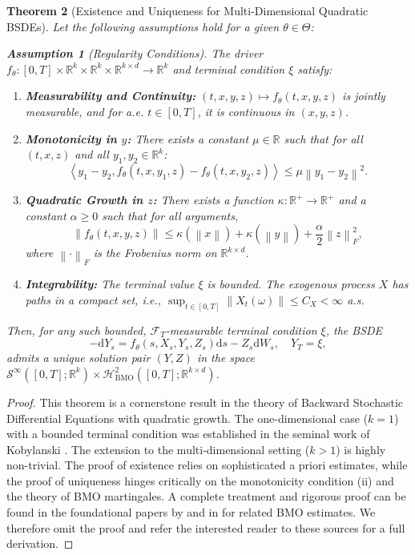 \documentclass[qian]{imsart}
\newcommand{\R}{\mathbb{R}}
\newcommand{\Fcal}{\mathcal{F}}
\newcommand{\dd}{\mathrm{d}}
\newcommand{\norm}[1]{\left\lVert#1\right\rVert}
\newcommand{\scpr}[2]{\left\langle #1, #2 \right\rangle}
\theoremstyle{plain}
\newtheorem{theorem}{Theorem}[section]
\theoremstyle{definition}
\newtheorem{assumption}[theorem]{Assumption}
\begin{document}
\begin{theorem}[Existence and Uniqueness for Multi-Dimensional Quadratic BSDEs]
\label{thm:wellposedness_multidim_recap}
Let the following assumptions hold for a given $\theta \in \Theta$:
\begin{assumption}[Regularity Conditions]
\label{ass:wellposedness_multidim}
The driver $f_\theta: [0,T] \times \R^k \times \R^k \times \R^{k \times d} \to \R^k$ and terminal condition $\xi$ satisfy:
\begin{enumerate}[label=(\roman*)]
    \item \textbf{Measurability and Continuity:} $(t,x,y,z) \mapsto f_\theta(t,x,y,z)$ is jointly measurable, and for a.e. $t \in [0,T]$, it is continuous in $(x,y,z)$.
    \item \textbf{Monotonicity in $y$:} There exists a constant $\mu \in \R$ such that for all $(t,x,z)$ and all $y_1, y_2 \in \R^k$:
    \[ \scpr{y_1 - y_2}{f_\theta(t,x,y_1,z) - f_\theta(t,x,y_2,z)} \le \mu \norm{y_1 - y_2}^2. \]
    \item \textbf{Quadratic Growth in $z$:} There exists a function $\kappa: \R^+ \to \R^+$ and a constant $\alpha \ge 0$ such that for all arguments,
    \[ \norm{f_\theta(t,x,y,z)} \le \kappa(\norm{x}) + \kappa(\norm{y}) + \frac{\alpha}{2}\norm{z}_F^2, \]
    where $\norm{\cdot}_F$ is the Frobenius norm on $\R^{k \times d}$.
    \item \textbf{Integrability:} The terminal value $\xi$ is bounded. The exogenous process $X$ has paths in a compact set, i.e., $\sup_{t \in [0,T]} \norm{X_t(\omega)} \le C_X < \infty$ a.s.
\end{enumerate}
\end{assumption}
Then, for any such bounded, $\Fcal_T$-measurable terminal condition $\xi$, the BSDE
\begin{equation} \label{eq:bsde_def_multidim_revised}
    -\dd Y_s = f_\theta(s, X_s, Y_s, Z_s) \dd s - Z_s \dd W_s, \quad Y_T = \xi,
\end{equation}
admits a unique solution pair $(Y,Z)$ in the space $\mathcal{S}^\infty([0,T];\R^k) \times \mathcal{H}^2_{\mathrm{BMO}}([0,T];\R^{k \times d})$.
\end{theorem}

\begin{proof}
This theorem is a cornerstone result in the theory of Backward Stochastic Differential Equations with quadratic growth. The one-dimensional case ($k=1$) with a bounded terminal condition was established in the seminal work of Kobylanski \cite{Kobylanski2000}. The extension to the multi-dimensional setting ($k>1$) is highly non-trivial. The proof of existence relies on sophisticated a priori estimates, while the proof of uniqueness hinges critically on the monotonicity condition (ii) and the theory of BMO martingales. A complete treatment and rigorous proof can be found in the foundational papers by \cite{BriandDelyonHuPardouxStoica2003} and in \cite{BriandHu2008} for related BMO estimates. We therefore omit the proof and refer the interested reader to these sources for a full derivation.
\end{proof}
\end{document}
